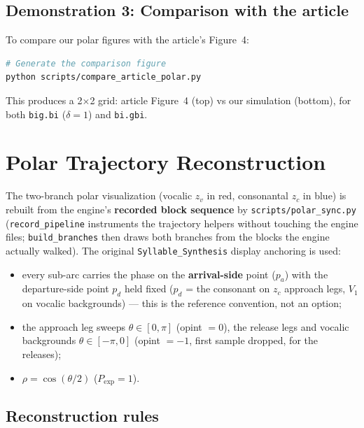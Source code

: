 \documentclass[11pt,a4paper]{article}
\begin{document}
\subsection{Demonstration 3: Comparison with the article}

To compare our polar figures with the article's Figure~4:

\begin{lstlisting}[language=bash]
# Generate the comparison figure
python scripts/compare_article_polar.py
\end{lstlisting}

This produces a 2$\times$2 grid: article Figure~4 (top) vs our
simulation (bottom), for both \texttt{big.bi} ($\delta=1$) and
\texttt{bi.gbi}.

\section{Polar Trajectory Reconstruction}

The two-branch polar visualization (vocalic $z_v$ in red,
consonantal $z_c$ in blue) is rebuilt from the engine's
\textbf{recorded block sequence} by \texttt{scripts/polar\_sync.py}
(\texttt{record\_pipeline} instruments the trajectory helpers without
touching the engine files; \texttt{build\_branches} then draws both
branches from the blocks the engine actually walked). The original
\texttt{Syllable\_Synthesis} display anchoring is used:

\begin{itemize}
\item every sub-arc carries the phase on the \textbf{arrival-side}
  point ($p_a$) with the departure-side point $p_d$ held fixed ($p_d$
  = the consonant on $z_c$ approach legs, $V_1$ on vocalic
  backgrounds) --- this is the reference convention, not an option;
\item the approach leg sweeps $\theta \in [0, \pi]$ (opint $= 0$),
  the release legs and vocalic backgrounds $\theta \in [-\pi, 0]$
  (opint $= -1$, first sample dropped, for the releases);
\item $\rho = \cos(\theta/2)$ ($P_{\exp} = 1$).
\end{itemize}

\subsection{Reconstruction rules}
\end{document}
